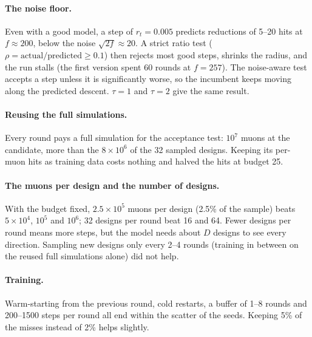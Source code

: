 \documentclass[11pt,a4paper]{article}
\begin{document}
\paragraph{The noise floor.} Even with a good model, a step of $r_t=0.005$ predicts reductions of
5--20 hits at $f\approx200$, below the noise $\sqrt{2f}\approx20$. A strict ratio test
($\rho=\text{actual}/\text{predicted}\ge0.1$) then rejects most good steps, shrinks the radius, and
the run stalls (the first version spent 60 rounds at $f=257$). The noise-aware test accepts a
step unless it is significantly worse, so the incumbent keeps moving along the predicted descent.
$\tau=1$ and $\tau=2$ give the same result.

\paragraph{Reusing the full simulations.} Every round pays a full simulation for the acceptance
test: $10^7$ muons at the candidate, more than the $8\times10^6$ of the 32 sampled designs.
Keeping its per-muon hits as training data costs nothing and halved the hits at budget 25.

\paragraph{The muons per design and the number of designs.} With the budget fixed, $2.5\times10^5$
muons per design (2.5\% of the sample) beats $5\times10^4$, $10^5$ and $10^6$; 32 designs per
round beat 16 and 64. Fewer designs per round means more steps, but the model needs about $D$
designs to see every direction. Sampling new designs only every 2--4 rounds (training in between
on the reused full simulations alone) did not help.

\paragraph{Training.} Warm-starting from the previous round, cold restarts, a buffer of 1--8 rounds
and 200--1500 steps per round all end within the scatter of the seeds. Keeping 5\% of the misses
instead of 2\% helps slightly.
\end{document}
